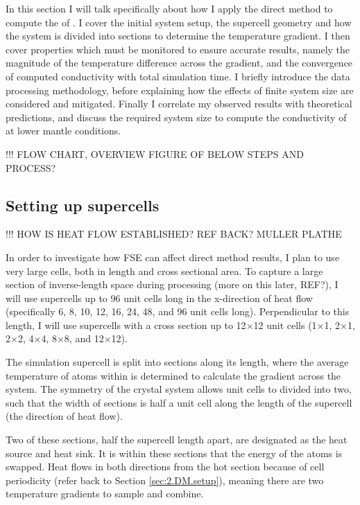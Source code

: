 In this section I will talk specifically about how I apply the direct method to compute the \tcs of \bdg. I cover the initial system setup, the supercell geometry and how the system is divided into sections to determine the temperature gradient. I then cover properties which must be monitored to ensure accurate results, namely the magnitude of the temperature difference across the gradient, and the convergence of computed conductivity with total simulation time. I briefly introduce the data processing methodology, before explaining how the effects of finite system size are considered and mitigated. Finally I correlate my observed results with theoretical predictions, and discuss the required system size to compute the conductivity of \bdgs at lower mantle conditions.

!!! FLOW CHART, OVERVIEW FIGURE OF BELOW STEPS AND PROCESS?


\subsection{\label{sec:3.DM.cell}Setting up supercells}

!!! HOW IS HEAT FLOW ESTABLISHED? REF BACK? MULLER PLATHE

In order to investigate how FSE can affect direct method results, I plan to use very large cells, both in length and cross sectional area. To capture a large section of inverse-length space during processing (more on this later, REF?), I will use supercells up to 96 unit cells long in the x-direction of heat flow (specifically 6, 8, 10, 12, 16, 24, 48, and 96 unit cells long). Perpendicular to this length, I will use supercells with a cross section up to 12$\times$12 unit cells (1$\times$1, 2$\times$1, 2$\times$2, 4$\times$4, 8$\times$8, and 12$\times$12).

The simulation supercell is split into sections along its length, where the average temperature of atoms within is determined to calculate the gradient across the system. The symmetry of the \bdgs crystal system allows unit cells to divided into two, such that the width of sections is half a unit cell along the length of the supercell (the direction of heat flow). 

Two of these sections, half the supercell length apart, are designated as the heat source and heat sink. It is within these sections that the energy of the atoms is swapped. Heat flows in both directions from the hot section because of cell periodicity (refer back to Section \ref{sec:2.DM.setup}), meaning there are two temperature gradients to sample and combine. 

